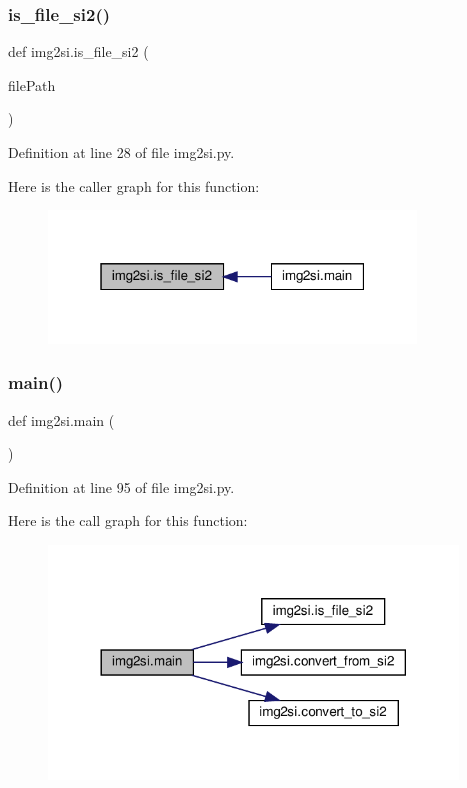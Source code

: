 \subsubsection{\texorpdfstring{is\+\_\+file\+\_\+si2()}{is\_file\_si2()}}
{\footnotesize\ttfamily def img2si.\+is\+\_\+file\+\_\+si2 (\begin{DoxyParamCaption}\item[{}]{file\+Path }\end{DoxyParamCaption})}



Definition at line 28 of file img2si.\+py.

Here is the caller graph for this function\+:\nopagebreak
\begin{figure}[H]
\begin{center}
\leavevmode
\includegraphics[width=277pt]{namespaceimg2si_a30df945259118023030181e530c9f6df_icgraph}
\end{center}
\end{figure}
\mbox{\label{namespaceimg2si_a87146d74b97186b359e4b3572eaec249}} 
\subsubsection{\texorpdfstring{main()}{main()}}
{\footnotesize\ttfamily def img2si.\+main (\begin{DoxyParamCaption}{ }\end{DoxyParamCaption})}



Definition at line 95 of file img2si.\+py.

Here is the call graph for this function\+:\nopagebreak
\begin{figure}[H]
\begin{center}
\leavevmode
\includegraphics[width=308pt]{namespaceimg2si_a87146d74b97186b359e4b3572eaec249_cgraph}
\end{center}
\end{figure}
